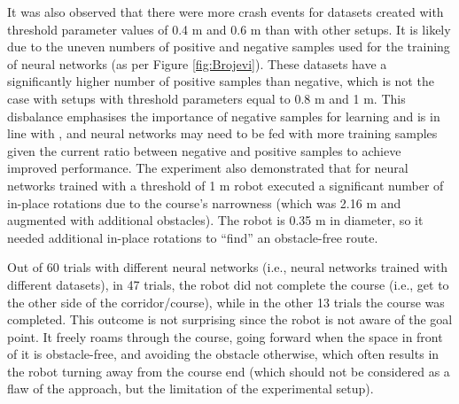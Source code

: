 It was also observed that there were more crash events for datasets created with threshold parameter values of 0.4 m and 0.6 m than with other setups. It is likely due to the uneven numbers of positive and negative samples used for the training of neural networks (as per Figure \ref{fig:Brojevi}). These datasets have a significantly higher number of positive samples than negative, which is not the case with setups with threshold parameters equal to 0.8 m and 1 m. This disbalance emphasises the importance of negative samples for learning and is in line with \cite{Gandhi2017}, and neural networks may need to be fed with more training samples given the current ratio between negative and positive samples to achieve improved performance. The experiment also demonstrated that for neural networks trained with a threshold of  1 m robot executed a significant number of in-place rotations due to the course's narrowness (which was 2.16 m and augmented with additional obstacles). The robot is 0.35 m in diameter, so it needed additional in-place rotations to ``find'' an obstacle-free route.

Out of 60 trials with different neural networks (i.e., neural networks trained with different datasets), in 47 trials, the robot did not complete the course (i.e., get to the other side of the corridor/course), while in the other 13 trials the course was completed. This outcome is not surprising since the robot is not aware of the goal point. It freely roams through the course, going forward when the space in front of it is obstacle-free, and avoiding the obstacle otherwise, which often results in the robot turning away from the course end (which should not be considered as a flaw of the approach, but the limitation of the experimental setup).

